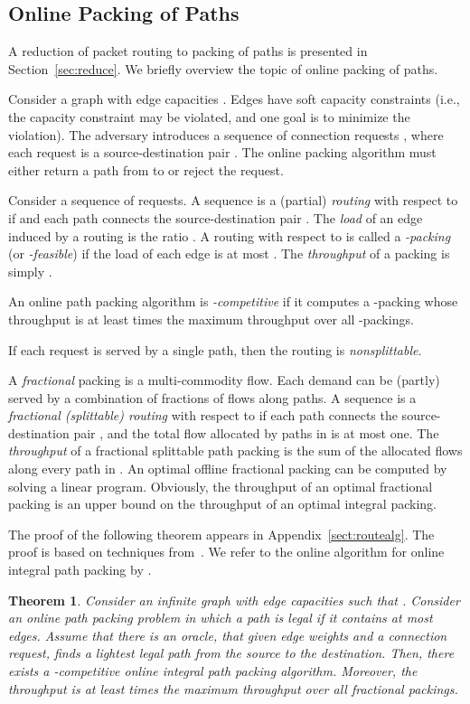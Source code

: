 \documentclass[11pt]{article}
\newtheorem{theorem}{Theorem}
\newenvironment{proof sketch}[1]{\noindent {\emph{Proof sketch of #1:}}}{\hfill \qed}
\begin{document}
\subsection{Online Packing of Paths}
\label{sect:routing}

A reduction of packet routing to packing of paths is presented in Section~\ref{sec:reduce}. We briefly overview the topic of online packing of paths.

Consider a graph  with edge capacities . Edges have soft capacity constraints (i.e., the capacity constraint may be violated, and one goal is to minimize the
violation).
The adversary introduces a sequence of connection requests
, where each request is a source-destination pair
. The online packing algorithm must either return a path
 from  to  or reject the request.

Consider a sequence  of requests. A sequence
 is a (partial) \emph{routing} with respect to  if
 and each path  connects the
source-destination pair .  The \emph{load} of an edge  induced
by a routing  is the ratio .
A routing  with respect to  is called a \emph{-packing} (or \emph{-feasible}) if the
load of each edge is at most . The \emph{throughput} of a packing
 is simply .

An online path packing algorithm is \emph{-competitive} if it computes a -packing  whose throughput is at least  times the maximum   throughput over all -packings.

If each request is served by a single path, then the routing is
\emph{nonsplittable}.

A \emph{fractional} packing is a multi-commodity flow. Each
demand can be (partly) served by a combination of fractions
of flows along paths. A sequence  is
a \emph{fractional (splittable) routing} with respect to
 if each path  connects the
source-destination pair , and the total flow allocated
by paths in  is at most one. The \emph{throughput} of
a fractional splittable path packing 
is the sum of the allocated flows along every path in
. An optimal offline fractional packing can be
computed by solving a linear program. Obviously, the
throughput of an optimal fractional packing is an upper
bound on the throughput of an optimal integral packing.


The proof of the following theorem appears in Appendix~\ref{sect:routealg}.
The proof is based on techniques from~\cite{AAP, BN06}.
We refer to the online algorithm for online integral path packing by .

\begin{theorem}\label{thm:IPP}
  Consider an infinite graph with edge capacities such that .  Consider an online path packing problem in which a
  path is legal if it contains at most  edges.
Assume that there is an oracle, that given edge weights and a
  connection request, finds a
  lightest legal path from the source to the destination. Then, there
exists a -competitive online
  integral path packing algorithm.  Moreover, the throughput is at least
 times the maximum throughput over all fractional packings.
\end{theorem}
\end{document}
